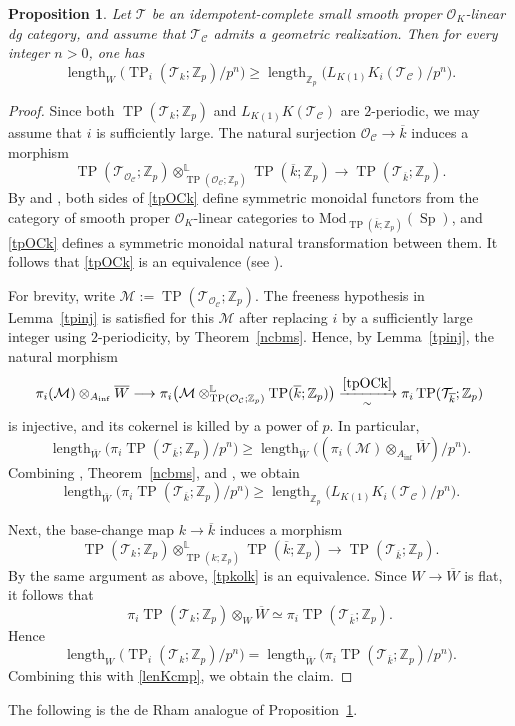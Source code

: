 \documentclass[11pt]{amsart}
\newtheorem{prop}[lemma]{Proposition}
\numberwithin{equation}{section}
\renewcommand{\L}{\mathbb{L}}
\newcommand{\Z}{\mathbb{Z}}
\newcommand{\sC}{\mathcal{C}}
\newcommand{\sO}{\mathcal{O}}
\newcommand{\sT}{\mathcal{T}}
\newcommand{\sM}{\mathcal{M}}
\newcommand{\len}{\operatorname{length}}
\newcommand{\Sp}{\operatorname{Sp}}
\numberwithin{equation}{section}
\newcommand{\ol}{\overline}
\newcommand{\Ainf}{A_{\operatorname{inf}}}
\newcommand{\TP}{\operatorname{TP}}
\newcommand{\LK}{{L_{K(1)}}}
\begin{document}
\begin{prop}\label{tplength}
Let $\sT$ be an idempotent-complete small smooth proper $\sO_K$-linear dg category, and assume that $\sT_\sC$ admits a geometric realization. Then for every integer $n>0$, one has
\[
\len_{W}\bigl(\TP_i(\sT_k;\Z_p)/p^n \bigr)
\geq
\len_{\Z_p}\bigl( \LK K_i(\sT_{\sC})/p^n \bigr).
\]
\end{prop}

\begin{proof}
Since both $\TP(\sT_k;\Z_p)$ and $\LK K(\sT_{\sC})$ are $2$-periodic, we may assume that $i$ is sufficiently large. The natural surjection $\sO_\sC \to \ol{k}$ induces a morphism
\begin{equation}\label{tpOCk}
\TP(\sT_{\sO_{\sC}};\Z_p)\otimes^{\L}_{\TP(\sO_{\sC};\Z_p)} \TP(\ol{k};\Z_p)
\longrightarrow
\TP(\sT_{\ol{k}};\Z_p).
\end{equation}
By \cite[Proposition 2.12]{M26} and \cite[Proposition 3.2]{M26}, both sides of \eqref{tpOCk} define symmetric monoidal functors from the category of smooth proper $\sO_K$-linear categories to $\text{Mod}_{\TP(\ol{k};\Z_p)}(\Sp)$, and \eqref{tpOCk} defines a symmetric monoidal natural transformation between them. It follows that \eqref{tpOCk} is an equivalence (see \cite[Proposition 4.6]{AMN18}).

For brevity, write $\sM:=\TP(\sT_{\sO_{\sC}};\Z_p)$.  The freeness hypothesis in Lemma~\ref{tpinj} is satisfied for this $\sM$ after replacing $i$ by a sufficiently large integer using $2$-periodicity, by Theorem~\ref{ncbms}.  Hence, by Lemma~\ref{tpinj}, the natural morphism
\[
\pi_i(\sM)\otimes_{\Ainf}\ol{W}
\longrightarrow
\pi_i\bigl(\sM\otimes^\L_{\TP(\sO_\sC;\Z_p)} \TP(\ol{k};\Z_p)\bigr)
\xrightarrow[\sim]{\eqref{tpOCk}}
\pi_i \TP(\sT_{\ol{k}};\Z_p)
\]
is injective, and its cokernel is killed by a power of $p$. In particular,
\[
\len_{\ol{W}}\bigl(\pi_i \TP(\sT_{\ol{k}};\Z_p)/p^n \bigr)
\geq
\len_{\ol{W}}\bigl((\pi_i(\sM)\otimes_{\Ainf}\ol{W})/p^n \bigr).
\]
Combining \cite[Corollary 4.15]{BMS18}, Theorem~\ref{ncbms}, and \cite[Theorem 3.5]{M26}, we obtain
\begin{equation}\label{lenKcmp}
\len_{\ol{W}}\bigl(\pi_i \TP(\sT_{\ol{k}};\Z_p)/p^n \bigr)
\geq
\len_{\Z_p}\bigl( \LK K_i(\sT_{\sC})/p^n \bigr).
\end{equation}

Next, the base-change map $k \to \ol{k}$ induces a morphism
\begin{equation}\label{tpkolk}
\TP(\sT_k;\Z_p)\otimes^\L_{\TP(k;\Z_p)}\TP(\ol{k};\Z_p)
\longrightarrow
\TP(\sT_{\ol{k}};\Z_p).
\end{equation}
By the same argument as above, \eqref{tpkolk} is an equivalence. Since $W\to \ol{W}$ is flat, it follows that
\[
\pi_i \TP(\sT_k;\Z_p)\otimes_W \ol{W}
\simeq
\pi_i \TP(\sT_{\ol{k}};\Z_p).
\]
Hence
\[
\len_{W}\bigl(\TP_i(\sT_k;\Z_p)/p^n\bigr)
=
\len_{\ol{W}}\bigl(\pi_i \TP(\sT_{\ol{k}};\Z_p)/p^n\bigr).
\]
Combining this with \eqref{lenKcmp}, we obtain the claim.
\end{proof}
The following is the de Rham analogue of Proposition~\ref{tplength}.
\end{document}
